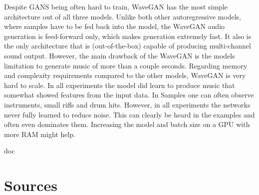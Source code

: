 \documentclass[12pt]{article}
\begin{document}

Despite GANS being often hard to train, WaveGAN has the most simple architecture out of all three models.
Unlike both other autoregressive models, where samples have to be fed back into the model, the WaveGAN audio generation is feed-forward only, which makes generation extremely fast.
It also is the only architecture that is (out-of-the-box) capable of producing multi-channel sound output.
However, the main drawback of the WaveGAN is the models limitation to generate music of more than a couple seconds.
Regarding memory and complexity requirements compared to the other models, WaveGAN is very hard to scale.
In all experiments the model did learn to produce music that somewhat showed features from the input data.
In Samples one can often observe instruments, small riffs and drum hits.
However, in all experiments the networks never fully learned to reduce noise.
This can clearly be heard in the examples and often even dominates them.
Increasing the model and batch size on a GPU with more RAM might help.

\newpage
\begin{btSect}{doc} %
\section*{Sources}
\btPrintCited
\end{btSect}
\end{document}
